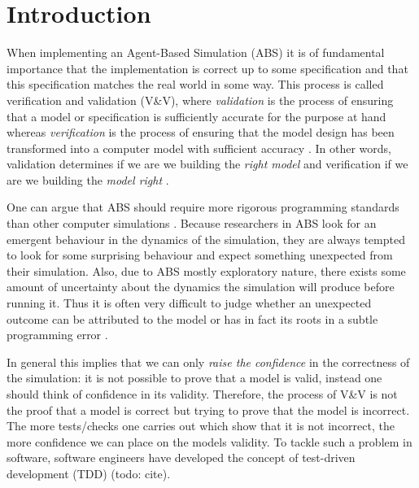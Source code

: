 \section{Introduction}
When implementing an Agent-Based Simulation (ABS) it is of fundamental importance that the implementation is correct up to some specification and that this specification matches the real world in some way. This process is called verification and validation (V\&V), where \textit{validation} is the process of ensuring that a model or specification is sufficiently accurate for the purpose at hand whereas \textit{verification} is the process of ensuring that the model design has been transformed into a computer model with sufficient accuracy \cite{robinson_simulation:_2014}. In other words, validation determines if we are we building the \textit{right model} and verification if we are we building the \textit{model right} \cite{balci_verification_1998}.

One can argue that ABS should require more rigorous programming standards than other computer simulations \cite{polhill_ghost_2005}. Because researchers in ABS look for an emergent behaviour in the dynamics of the simulation, they are always tempted to look for some surprising behaviour and expect something unexpected from their simulation. %
Also, due to ABS mostly exploratory nature, there exists some amount of uncertainty about the dynamics the simulation will produce before running it. Thus it is often very difficult to judge whether an unexpected outcome can be attributed to the model or has in fact its roots in a subtle programming error \cite{galan_errors_2009}.

In general this implies that we can only \textit{raise the confidence} in the correctness of the simulation: it is not possible to prove that a model is valid, instead one should think of confidence in its validity. Therefore, the process of V\&V is not the proof that a model is correct but trying to prove that the model is incorrect. The more tests/checks one carries out which show that it is not incorrect, the more confidence we can place on the models validity. To tackle such a problem in software, software engineers have developed the concept of test-driven development (TDD) (todo: cite).

